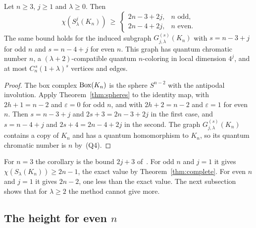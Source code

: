 \begin{corollary}\label{cor:kn}
Let $n\ge3$, $j\ge1$ and $\lambda\ge0$. Then
\[
 \chi(S^j_\lambda(K_n))\ \ge\
 \begin{cases}
 2n-3+2j,& n\text{ odd},\\
 2n-4+2j,& n\text{ even}.
 \end{cases}
\]
The same bound holds for the induced subgraph $G^{(s)}_{j,\lambda}(K_n)$ with $s=n-3+j$ for odd $n$ and $s=n-4+j$ for even $n$. This graph has quantum chromatic number $n$, a $(\lambda+2)$-compatible quantum $n$-coloring in local dimension $4^j$, and at most $C_n^{\,s}(1+\lambda)^s$ vertices and edges.
\end{corollary}
\begin{proof}
The box complex $\operatorname{Box}(K_n)$ is the sphere $S^{n-2}$ with the antipodal involution. Apply Theorem~\ref{thm:spheres} to the identity map, with $2h+1=n-2$ and $\varepsilon=0$ for odd $n$, and with $2h+2=n-2$ and $\varepsilon=1$ for even $n$. Then $s=n-3+j$ and $2s+3=2n-3+2j$ in the first case, and $s=n-4+j$ and $2s+4=2n-4+2j$ in the second. The graph $G^{(s)}_{j,\lambda}(K_n)$ contains a copy of $K_n$ and has a quantum homomorphism to $K_n$, so its quantum chromatic number is $n$ by~(Q4).
\end{proof}

For $n=3$ the corollary is the bound $2j+3$ of~\cite{Z}. For odd $n$ and $j=1$ it gives $\chi(S_\lambda(K_n))\ge2n-1$, the exact value by Theorem~\ref{thm:complete}. For even $n$ and $j=1$ it gives $2n-2$, one less than the exact value. The next subsection shows that for $\lambda\ge2$ the method cannot give more.

\subsection{The height for even \texorpdfstring{$n$}{n}}\label{sec:even}

